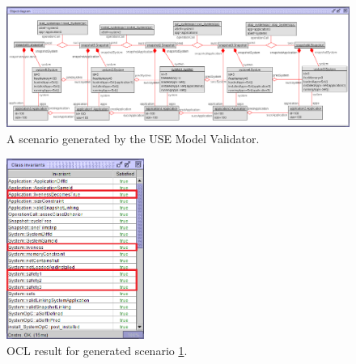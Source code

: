 \begin{figure}
    \centering
    \includegraphics[width=1\textwidth]{figures/c3/CaseStudy_ObjectDiagram_2.png}
    \caption{A scenario generated by the USE Model Validator.}
    \label{fig:object_diagram_case_study}
\end{figure}

\begin{figure}
    \centering
    \includegraphics[width=0.4\textwidth]{figures/c3/OCL_result_full_1_edited.png}
    \caption{OCL result for generated scenario \ref{fig:object_diagram_case_study}.}
    \label{fig:ocl_result_case_study}
\end{figure}